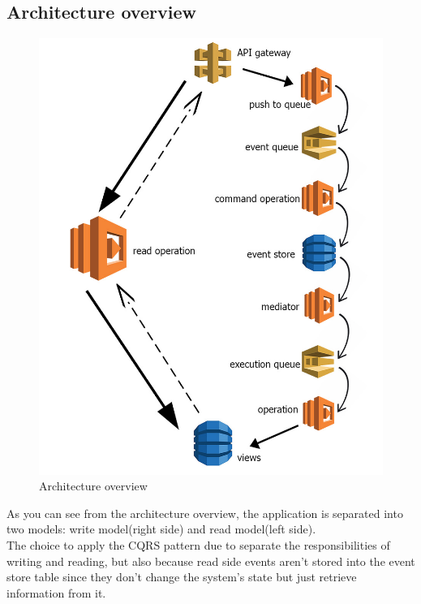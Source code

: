 \subsection{Architecture overview}
\begin{figure} [H]
	\centering
	\includegraphics[scale=0.55]{../Img/architecture}
	\caption{Architecture overview}\label{}
\end{figure}
As you can see from the architecture overview, the application is separated into two models: write model(right side) and read model(left side). \\
The choice to apply the CQRS pattern due to separate the responsibilities of writing and reading, but also because read side events aren't stored into the event store table since they don't change the system's state but just retrieve information from it.

